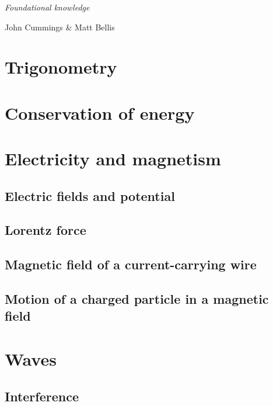 \documentclass{tufte-handout}
\begin{document}

{\LARGE {\em \noindent Foundational knowledge}} 

\large{\noindent John Cummings \&  Matt Bellis}

\section{Trigonometry}

\section{Conservation of energy}

\section{Electricity and magnetism}

\subsection{Electric fields and potential}

\subsection{Lorentz force}

\subsection{Magnetic field of a current-carrying wire}

\subsection{Motion of a charged particle in a magnetic field}

\section{Waves}

\subsection{Interference}
\end{document}
